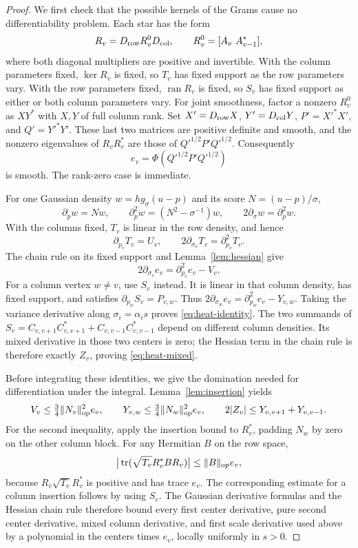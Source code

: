 \begin{proof}
We first check that the possible kernels of the Grams cause no
differentiability problem.  Each star has the form
\[
 R_v=D_{\rm row}R_v^0D_{\rm col},\qquad
 R_v^0=[A_v\ A_{v-1}^*],
\]
where both diagonal multipliers are positive and invertible.  With the
column parameters fixed, $\ker R_v$ is fixed, so $T_v$ has fixed
support as the row parameters vary.  With the row parameters fixed,
$\operatorname{ran}R_v$ is fixed, so $S_v$ has fixed support as either
or both column parameters vary.  For joint smoothness, factor a nonzero
$R_v^0$ as $XY^*$ with $X,Y$ of full column rank.  Set
$X'=D_{\rm row}X$, $Y'=D_{\rm col}Y$, $P'=X'^*X'$, and $Q'=Y'^*Y'$.
These last two matrices are positive definite and smooth, and the
nonzero eigenvalues of $R_vR_v^*$ are those of
$Q'^{1/2}P'Q'^{1/2}$.  Consequently
\[
 e_v=\Phi(Q'^{1/2}P'Q'^{1/2})
\]
is smooth.  The rank-zero case is immediate.

For one Gaussian density $w=h g_\sigma(u-p)$ and its score
$N=(u-p)/\sigma$,
\[
 \partial_pw=Nw,\qquad
 \partial_p^2w=(N^2-\sigma^{-1})w,\qquad
 2\partial_\sigma w=\partial_p^2w.
\]
With the columns fixed, $T_v$ is linear in the row density, and hence
\[
 \partial_{p_v}T_v=U_v,\qquad
 2\partial_{\sigma_v}T_v=\partial_{p_v}^2T_v.
\]
The chain rule on its fixed support and Lemma~\ref{lem:hessian} give
\[
 2\partial_{\sigma_v}e_v=\partial_{p_v}^2e_v-V_v.
\]
For a column vertex $w\ne v$, use $S_v$ instead.  It is linear in that
column density, has fixed support, and satisfies
$\partial_{p_w}S_v=P_{v,w}$.  Thus
$2\partial_{\sigma_w}e_v=\partial_{p_w}^2e_v-Y_{v,w}$.
Taking the variance derivative along $\sigma_i=\alpha_i s$ proves
\eqref{eq:heat-identity}.  The two summands of
$S_v=C_{v,v+1}C_{v,v+1}^*+C_{v,v-1}C_{v,v-1}^*$ depend on different
column densities.  Its mixed derivative in those two centers is zero;
the Hessian term in the chain rule is therefore exactly $Z_v$, proving
\eqref{eq:heat-mixed}.

Before integrating these identities, we give the domination needed for
differentiation under the integral.  Lemma~\ref{lem:insertion} yields
\[
 V_v\le\tfrac34\|N_v\|_{\mathrm{op}}^2e_v,
 \qquad
 Y_{v,w}\le\tfrac34\|N_w\|_{\mathrm{op}}^2e_v,
 \qquad
 2|Z_v|\le Y_{v,v+1}+Y_{v,v-1}.
\]
For the second inequality, apply the insertion bound to $R_v^*$,
padding $N_w$ by zero on the other column block.
For any Hermitian $B$ on the row space,
\[
 \big|\operatorname{tr}(\sqrt{T_v}R_v^*BR_v)\big|
 \le\|B\|_{\mathrm{op}}e_v,
\]
because $R_v\sqrt{T_v}R_v^*$ is positive and has trace $e_v$.
The corresponding estimate for a column insertion follows by using
$S_v$.  The Gaussian derivative formulas and the Hessian chain rule
therefore bound every first center derivative, pure second center
derivative, mixed column derivative, and first scale derivative used
above by a polynomial in the centers times $e_v$, locally uniformly in
$s>0$.


\end{proof}
